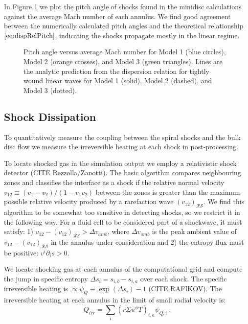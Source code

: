 \documentclass{emulateapj}
\begin{document}
In Figure \ref{fi:disp} we plot the pitch angle of shocks found in the minidisc calculations against the average Mach number of each annulus. We find good agreement between the numerically calculated pitch angles and the theoretical relationship $\eqref{eq:dispRelPitch}$, indicating the shocks propagate mostly in the linear regime.

\begin{figure}
\caption{\label{fi:disp} Pitch angle versus average Mach number for Model 1 (blue circles), Model 2 (orange crosses), and Model 3 (green triangles). Lines are the analytic prediction from the dispersion relation for tightly wound linear waves for Model 1 (solid), Model 2 (dashed), and Model 3 (dotted).}
\end{figure}



\subsection{Shock Dissipation}
\label{subsec:diss}

To quantitatively measure the coupling between the spiral shocks and the bulk disc flow we measure the irreversible heating at each shock in post-processing. 

To locate shocked gas in the simulation output we employ a relativistic shock detector (CITE Rezzolla/Zanotti).  The basic algorithm compares neighbouring zones and classifies the interface as a shock if the relative normal velocity $v_{12} \equiv (v_1 - v_2) / (1-v_1 v_2)$ between the zones is greater than the maximum possible relative velocity produced by a rarefaction wave $(v_{12})_{\mathcal{RS}}$.  We find this algorithm to be somewhat too sensitive in detecting shocks, so we restrict it in the following way.  For a fluid cell to be considered part of a shockwave, it must satisfy: 1) $v_{12} - (v_{12})_{\mathcal{RS}} > \Delta v_{amb}$, where $\Delta v_{amb}$ is the peak ambient value of $v_{12} - (v_{12})_{\mathcal{RS}}$ in the annulus under consideration and 2) the entropy flux must be positive: $v^i \partial_i s > 0$.

We locate shocking gas at each annulus of the computational grid and compute the jump in specific entropy $\Delta s_i = s_{i,b} - s_{i,a}$ over each shock.  The specific irreversible heating is $\propto \psi_Q \equiv \exp{(\Delta s_i)} - 1$ (CITE RAFIKOV).  The irreversible heating at each annulus in the limit of small radial velocity is:
\begin{equation}
	\dot{Q}_{irr} = \sum_i \left( r\Sigma u^\phi T \right)_{i,a} \psi_{Q,i} \ . \label{eq:QirrRaf}
\end{equation}
\end{document}
